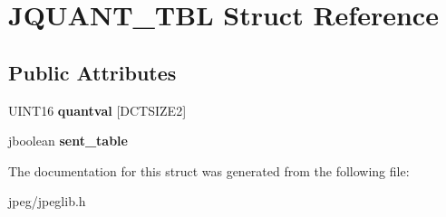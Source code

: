 \hypertarget{struct_j_q_u_a_n_t___t_b_l}{}\section{J\+Q\+U\+A\+N\+T\+\_\+\+T\+BL Struct Reference}
\label{struct_j_q_u_a_n_t___t_b_l}
\subsection*{Public Attributes}
\begin{DoxyCompactItemize}
\item 
U\+I\+N\+T16 {\bfseries quantval} \mbox{[}D\+C\+T\+S\+I\+Z\+E2\mbox{]}\hypertarget{struct_j_q_u_a_n_t___t_b_l_ab5b5150e73282a62ca7dc0f7e2fac944}{}\label{struct_j_q_u_a_n_t___t_b_l_ab5b5150e73282a62ca7dc0f7e2fac944}

\item 
jboolean {\bfseries sent\+\_\+table}\hypertarget{struct_j_q_u_a_n_t___t_b_l_a3cd9bbb31ba5b3ebb5617f5df9c08e46}{}\label{struct_j_q_u_a_n_t___t_b_l_a3cd9bbb31ba5b3ebb5617f5df9c08e46}

\end{DoxyCompactItemize}


The documentation for this struct was generated from the following file\+:\begin{DoxyCompactItemize}
\item 
jpeg/jpeglib.\+h\end{DoxyCompactItemize}
